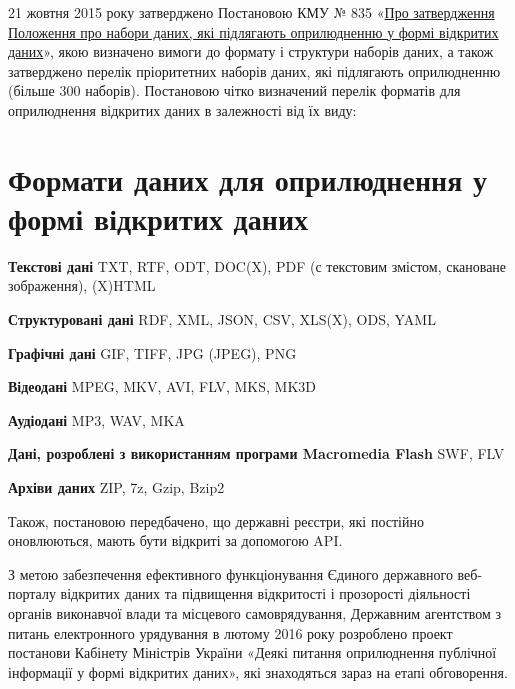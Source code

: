 21 жовтня 2015 року затверджено Постановою КМУ № 835 «\href{http://zakon5.rada.gov.ua/laws/show/835-2015-%D0%BF}{Про затвердження Положення про набори даних, які підлягають оприлюдненню у формі відкритих даних}», якою визначено вимоги до формату і структури наборів даних, а також затверджено перелік пріоритетних наборів даних, які підлягають оприлюдненню (більше 300 наборів). Постановою чітко визначений перелік форматів для оприлюднення відкритих даних в залежності від їх виду:

\section{Формати даних для оприлюднення у формі відкритих даних}

\textbf{Текстові дані}  
TXT, RTF, ODT, DOC(X), PDF (с текстовим змістом, скановане зображення), (X)HTML

\textbf{Структуровані дані}  
RDF, XML, JSON, CSV, XLS(X), ODS, YAML

\textbf{Графічні дані}  
GIF, TIFF, JPG (JPEG), PNG

\textbf{Відеодані}  
MPEG, MKV, AVI, FLV, MKS, MK3D

\textbf{Аудіодані}  
MP3, WAV, MKA

\textbf{Дані, розроблені з використанням програми Macromedia Flash}  
SWF, FLV

\textbf{Архіви даних}  
ZIP, 7z, Gzip, Bzip2

Також, постановою передбачено, що державні реєстри, які постійно оновлюються, мають бути відкриті за допомогою API.

З метою забезпечення ефективного функціонування Єдиного державного веб-порталу відкритих даних та підвищення відкритості і прозорості діяльності органів виконавчої влади та місцевого самоврядування, Державним агентством з питань електронного урядування в лютому 2016 року розроблено проект постанови Кабінету Міністрів України «Деякі питання оприлюднення публічної інформації у формі відкритих даних», які знаходяться зараз на етапі обговорення.
